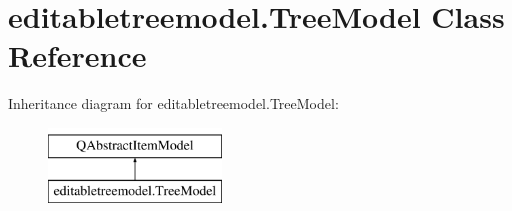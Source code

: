\hypertarget{classeditabletreemodel_1_1TreeModel}{}\section{editabletreemodel.\+Tree\+Model Class Reference}
\label{classeditabletreemodel_1_1TreeModel}
Inheritance diagram for editabletreemodel.\+Tree\+Model\+:\begin{figure}[H]
\begin{center}
\leavevmode
\includegraphics[height=2.000000cm]{classeditabletreemodel_1_1TreeModel}
\end{center}
\end{figure}
